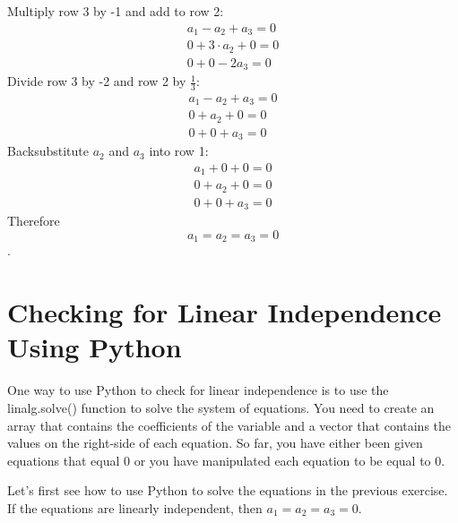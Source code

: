 \begin{Answer}[ref=vector_independence]
	Multiply row 3 by -1 and add to row 2:
		$$\begin{matrix}
			a_1 - a_2 + a_3 = 0 \\
			0 + 3\cdot a_2 + 0 = 0 \\
			0 + 0 - 2a_3 = 0
		\end{matrix} $$
    Divide row 3 by -2 and row 2 by $\frac{1}{3}$:
    	$$\begin{matrix}
			a_1 - a_2 + a_3 = 0 \\
			0 +  a_2 +0  = 0 \\
			0  + 0  + a_3 = 0
		\end{matrix} $$
	Backsubstitute $a_2$ and $a_3$ into row 1:
	 	$$\begin{matrix}
			a_1 + 0 + 0 = 0 \\
			0 +  a_2 + 0   = 0 \\
			0   + 0  + a_3 = 0
		\end{matrix} $$
	 Therefore $$a_1 = a_2 = a_3 = 0$$.
\end{Answer}
    
\section{Checking for Linear Independence Using Python}  
One way to use Python to check for linear independence is to use the 
linalg.solve() function to solve the system of equations. You need to create 
an array that contains the coefficients of the variable and a vector that 
contains the values on the right-side of each equation. So far, you have either 
been given equations that equal 0 or you have manipulated each equation to be 
equal to 0. 

Let's first see how to use Python to solve the equations in the previous 
exercise. If the equations are linearly independent, then $a_1 = a_2 = a_3 = 0$.

